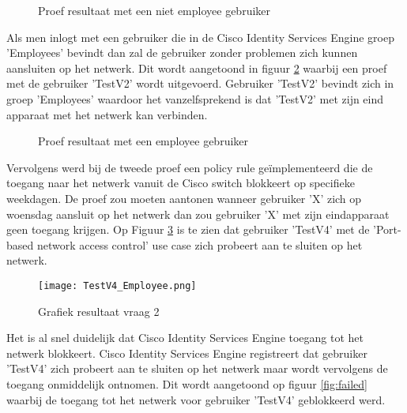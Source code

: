 \begin{figure}[H]
	\centering
	\qquad
	\newline
	\caption{Proef resultaat met een niet employee gebruiker}%
	\label{fig:Test_gebruiker}%
\end{figure}

Als men inlogt met een gebruiker die in de Cisco Identity Services Engine groep 'Employees' bevindt dan zal de gebruiker zonder problemen zich kunnen aansluiten op het netwerk. Dit wordt aangetoond in figuur \ref{fig:Test_gebruiker} waarbij een proef met de gebruiker 'TestV2' wordt uitgevoerd. Gebruiker 'TestV2' bevindt zich in groep 'Employees' waardoor het vanzelfsprekend is dat 'TestV2' met zijn eind apparaat met het netwerk kan verbinden. 

\begin{figure}[H]
	\centering
	\qquad
	\newline
	\qquad
	\caption{Proef resultaat met een employee gebruiker}%
	\label{fig:Test_gebruiker}%
\end{figure}

Vervolgens werd bij de tweede proef een policy rule geïmplementeerd die de toegang naar het netwerk vanuit de Cisco switch blokkeert op specifieke weekdagen.  De proef zou moeten aantonen wanneer gebruiker 'X' zich op woensdag aansluit op het netwerk dan zou gebruiker 'X' met zijn eindapparaat geen toegang krijgen.
Op Figuur \ref{fig:Woensdag} is te zien dat gebruiker 'TestV4' met de 'Port-based network access control' use case zich probeert aan te sluiten op het netwerk. 

\begin{figure}[H]
	\centering
	\texttt{[image: TestV4\_Employee.png]}
	\caption{Grafiek resultaat vraag 2}
	\label{fig:Woensdag}
\end{figure}

Het is al snel duidelijk dat Cisco Identity Services Engine toegang tot het netwerk blokkeert. Cisco Identity Services Engine registreert dat gebruiker 'TestV4' zich probeert aan te sluiten op het netwerk maar wordt vervolgens de toegang onmiddelijk ontnomen. Dit wordt aangetoond op figuur \ref{fig:failed} waarbij de toegang tot het netwerk voor gebruiker 'TestV4' geblokkeerd werd. 

